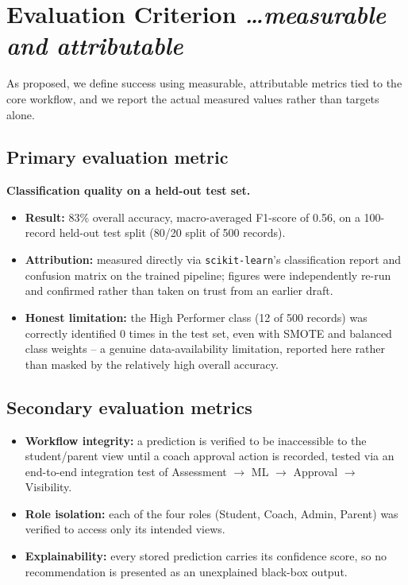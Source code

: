 \documentclass[11pt,a4paper]{article}
\newcommand{\BvrHint}[1]{%
  {\normalfont\normalsize\itshape\hfill #1}}
\begin{document}
\section{Evaluation Criterion %
\BvrHint{\ldots measurable and attributable}}
As proposed, we define success using measurable,
attributable metrics tied to the core workflow, and we
report the actual measured values rather than targets
alone.

\subsection{Primary evaluation metric}
\textbf{Classification quality on a held-out test set.}
\begin{itemize}[leftmargin=0.7cm]
    \item \textbf{Result:} 83\% overall accuracy, macro-averaged F1-score of 0.56, on a 100-record held-out test split (80/20 split of 500 records).
    \item \textbf{Attribution:} measured directly via \texttt{scikit-learn}'s classification report and confusion matrix on the trained pipeline; figures were independently re-run and confirmed rather than taken on trust from an earlier draft.
    \item \textbf{Honest limitation:} the High Performer class (12 of 500 records) was correctly identified 0 times in the test set, even with SMOTE and balanced class weights -- a genuine data-availability limitation, reported here rather than masked by the relatively high overall accuracy.
\end{itemize}

\subsection{Secondary evaluation metrics}
\begin{itemize}[leftmargin=0.7cm]
    \item \textbf{Workflow integrity:} a prediction is verified to be inaccessible to the student/parent view until a coach approval action is recorded, tested via an end-to-end integration test of Assessment $\to$ ML $\to$ Approval $\to$ Visibility.
    \item \textbf{Role isolation:} each of the four roles (Student, Coach, Admin, Parent) was verified to access only its intended views.
    \item \textbf{Explainability:} every stored prediction carries its confidence score, so no recommendation is presented as an unexplained black-box output.
\end{itemize}
\end{document}
